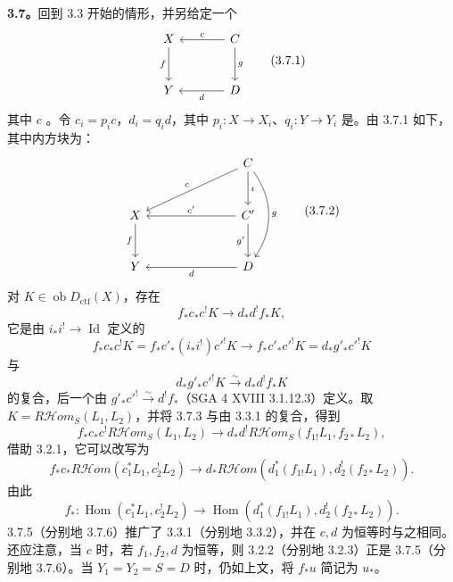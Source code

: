\textbf{3.7。}回到 3.3 开始的情形，并另给定一个
\[
\begin{tikzcd}[column sep=large,row sep=large]
X\arrow[d,"f"'] & C\arrow[l,"c"']\arrow[d,"g"]\\
Y & D\arrow[l,"d"]
\end{tikzcd}\tag{3.7.1}
\]
其中 $c$ 。令 $c_i=p_ic$，$d_i=q_id$，其中 $p_i:X\to X_i$、$q_i:Y\to Y_i$ 是。由 3.7.1 如下，其中内方块为：
\[
\begin{tikzcd}[column sep=large,row sep=large]
&& C\arrow[d,"i"]\arrow[dll,"c"']\arrow[dd,"g",bend left=35]\\
X\arrow[d,"f"'] && C'\arrow[ll,"c'"']\arrow[d,"g'"']\\
Y && D\arrow[ll,"d"]
\end{tikzcd}\tag{3.7.2}
\]
对 $K\in\operatorname{ob}D_{\mathrm{ctf}}(X)$，存在
\[
f_*c_*c^!K\longrightarrow d_*d^!f_*K,\tag{3.7.3}
\]
它是由 $i_*i^!\to\operatorname{Id}$ 定义的
\[
f_*c_*c^!K=f_*c'_*(i_*i^!)c'^!K\longrightarrow f_*c'_*c'^!K=d_*g'_*c'^!K
\]
与
\[
d_*g'_*c'^!K\xrightarrow\sim d_*d^!f_*K
\]
的复合，后一个由 $g'_*c'^!\xrightarrow\sim d^!f_*$（SGA 4 XVIII 3.1.12.3）定义。取 $K=R\mathcal Hom_S(L_1,L_2)$，并将 3.7.3 与由 3.3.1 的复合，得到
\[
f_*c_*c^!R\mathcal Hom_S(L_1,L_2)\longrightarrow d_*d^!R\mathcal Hom_S(f_{1!}L_1,f_{2*}L_2),\tag{3.7.4}
\]
借助 3.2.1，它可以改写为
\[
f_*c_*R\mathcal Hom(c_1^*L_1,c_2^!L_2)\longrightarrow
 d_*R\mathcal Hom(d_1^*(f_{1!}L_1),d_2^!(f_{2*}L_2)).\tag{3.7.5}
\]
由此
\[
f_*:\operatorname{Hom}(c_1^*L_1,c_2^!L_2)\longrightarrow
\operatorname{Hom}(d_1^*(f_{1!}L_1),d_2^!(f_{2*}L_2)).\tag{3.7.6}
\]
 3.7.5（分别地 3.7.6）推广了 3.3.1（分别地 3.3.2），并在 $c,d$ 为恒等时与之相同。还应注意，当 $c$ 时，若 $f_1,f_2,d$ 为恒等，则 3.2.2（分别地 3.2.3）正是 3.7.5（分别地 3.7.6）。当 $Y_1=Y_2=S=D$ 时，仍如上文，将 $f_*u$ 简记为 $u_*$。
